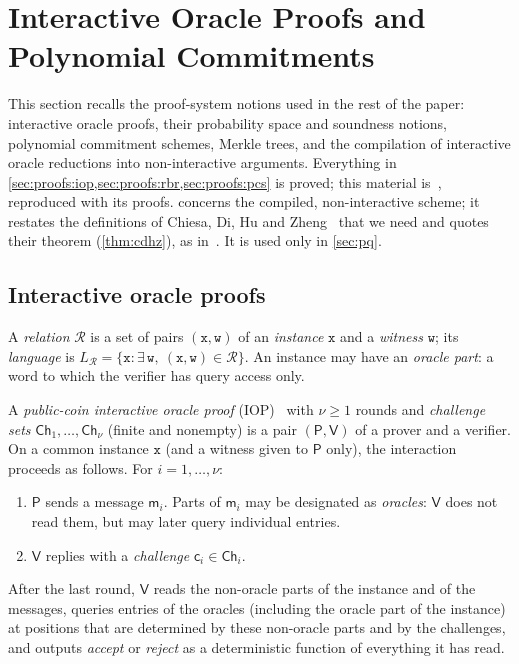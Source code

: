 \section{Interactive Oracle Proofs and Polynomial Commitments}\label{sec:proofs}

This section recalls the proof-system notions used in the rest of the paper: interactive oracle proofs, their probability space and soundness notions, polynomial commitment schemes, Merkle trees, and the compilation of interactive oracle reductions into non-interactive arguments.
Everything in \cref{sec:proofs:iop,sec:proofs:rbr,sec:proofs:pcs} is proved; this material is~\cite[\S3.1--3.4]{Mkh26}, reproduced with its proofs.
 concerns the compiled, non-interactive scheme; it restates the definitions of Chiesa, Di, Hu and Zheng~\cite{CDHZ25} that we need and quotes their theorem (\cref{thm:cdhz}), as in~\cite[\S3.5]{Mkh26}. It is used only in \cref{sec:pq}.

\subsection{Interactive oracle proofs}\label{sec:proofs:iop}

A \emph{relation} $\mathcal{R}$ is a set of pairs $(\mathtt{x},\mathtt{w})$ of an \emph{instance} $\mathtt{x}$ and a \emph{witness} $\mathtt{w}$; its \emph{language} is $L_{\mathcal{R}} = \{\mathtt{x} : \exists\, \mathtt{w},\ (\mathtt{x},\mathtt{w}) \in \mathcal{R}\}$.
An instance may have an \emph{oracle part}: a word to which the verifier has query access only.

\begin{definition}\label{def:iop}
A \emph{public-coin interactive oracle proof} (IOP)~\cite{BCS16} with $\nu \ge 1$ rounds and \emph{challenge sets} $\mathsf{Ch}_1,\dots,\mathsf{Ch}_\nu$ (finite and nonempty) is a pair $(\mathsf{P},\mathsf{V})$ of a prover and a verifier.
On a common instance $\mathtt{x}$ (and a witness given to $\mathsf{P}$ only), the interaction proceeds as follows. For $i = 1, \dots, \nu$:
\begin{enumerate}
  \item $\mathsf{P}$ sends a message $\mathsf{m}_i$. Parts of $\mathsf{m}_i$ may be designated as \emph{oracles}: $\mathsf{V}$ does not read them, but may later query individual entries.
  \item $\mathsf{V}$ replies with a \emph{challenge} $\mathsf{c}_i \in \mathsf{Ch}_i$.
\end{enumerate}
After the last round, $\mathsf{V}$ reads the non-oracle parts of the instance and of the messages, queries entries of the oracles (including the oracle part of the instance) at positions that are determined by these non-oracle parts and by the challenges, and outputs \emph{accept} or \emph{reject} as a deterministic function of everything it has read.
\end{definition}

